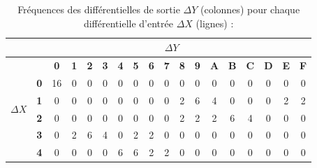 \documentclass[fleqn]{article}
\begin{document}
\begin{table}[H]
\captionsetup{labelfont=bf}
\caption{Fréquences des différentielles de sortie $\Delta Y$
(colonnes) pour chaque différentielle d’entrée $\Delta X$ (lignes) :\newline}
\begin{tabular}{c|c|c|c|c|c|c|c|c|c|c|c|c|c|c|c|c|c|}
\cline{2-18}
                                                            & \multicolumn{17}{c|}{\textbf{$\Delta Y$}}                                                                                                                                                                                  \\ \hline
\multicolumn{1}{|c|}{\multirow{17}{*}{\textbf{$\Delta X$}}} & \textbf{}  & \textbf{0} & \textbf{1} & \textbf{2} & \textbf{3} & \textbf{4} & \textbf{5} & \textbf{6} & \textbf{7} & \textbf{8} & \textbf{9} & \textbf{A} & \textbf{B} & \textbf{C} & \textbf{D} & \textbf{E} & \textbf{F} \\ \cline{2-18} 
\multicolumn{1}{|c|}{}                                      & \textbf{0} & 16         & 0          & 0          & 0          & 0          & 0          & 0          & 0          & 0          & 0          & 0          & 0          & 0          & 0          & 0          & 0          \\ \cline{2-18} 
\multicolumn{1}{|c|}{}                                      & \textbf{1} & 0          & 0          & 0          & 0          & 0          & 0          & 0          & 0          & 2          & 6          & 4          & 0          & 0          & 0          & 2          & 2          \\ \cline{2-18} 
\multicolumn{1}{|c|}{}                                      & \textbf{2} & 0          & 0          & 0          & 0          & 0          & 0          & 0          & 0          & 2          & 2          & 2          & 6          & 4          & 0          & 0          & 0          \\ \cline{2-18} 
\multicolumn{1}{|c|}{}                                      & \textbf{3} & 0          & 2          & 6          & 4          & 0          & 2          & 2          & 0          & 0          & 0          & 0          & 0          & 0          & 0          & 0          & 0          \\ \cline{2-18} 
\multicolumn{1}{|c|}{}                                      & \textbf{4} & 0          & 0          & 0          & 0          & 6          & 6          & 2          & 2          & 0          & 0          & 0          & 0          & 0          & 0          & 0          & 0          \\ \cline{2-18} 

\end{tabular}
\end{table}
\end{document}
